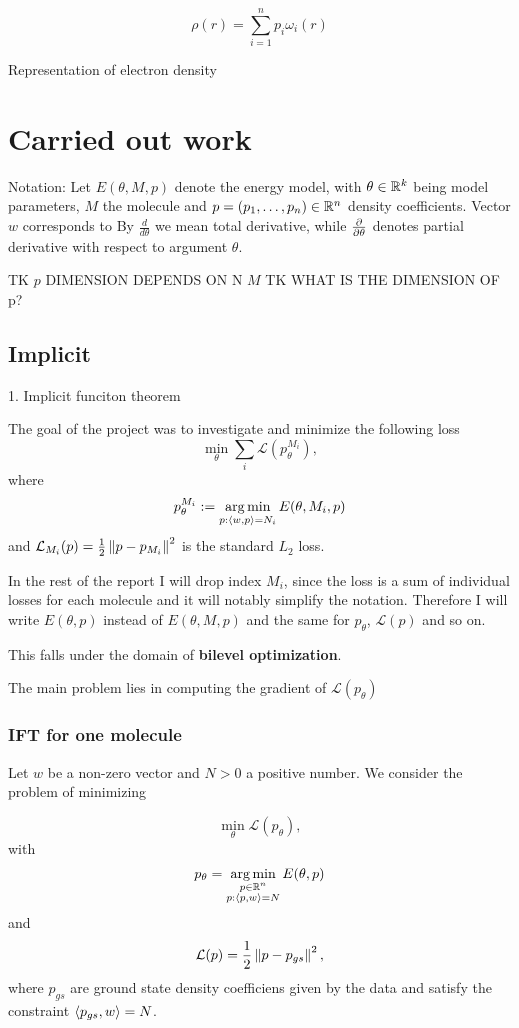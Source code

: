 \documentclass[a4paper,10pt]{report}
\begin{document}
\begin{equation}
 \rho(r) = \sum_{i=1}^n p_i \omega_i(r)
\end{equation}


Representation of electron density
\section{Carried out work}
Notation: Let $E(\theta, M ,p)$ denote the energy model, with $\theta \in \mathbb{R}^k$ being model parameters, $M$ the molecule and $p=(p_1, \ldots ,p_n )\in \mathbb{R}^n$ density coefficients. Vector $w$ corresponds to
By $\frac{d}{d\theta}$ we mean total derivative, while $\frac{\partial }{\partial \theta}$ denotes partial derivative with respect to argument $\theta$.

TK $p$ DIMENSION DEPENDS ON N $M$
TK WHAT IS THE DIMENSION OF p?

 \subsection{Implicit}
1. Implicit funciton theorem

The goal of the project was to investigate and minimize the following loss
\begin{equation}
 \min_\theta \sum_i \mathcal{L}(p_{\theta}^{M_i}),
\end{equation}
where
\begin{equation}
  p_\theta^{M_i}:=\operatorname*{arg\,min}_{p : \langle w, p \rangle=N_i} E(\theta,M_i,p)
\end{equation}
and $\mathcal{L}_{M_i}(p) = \frac{1}{2}\left\|p-p_{M_i}\right\|^2$ is the standard $L_2$ loss.

In the rest of the report I will drop index $M_i$, since the loss is a sum of individual losses for each molecule and it will notably simplify the notation.
Therefore I will write $E(\theta,p)$ instead of $E(\theta,M,p)$ and the same for $p_\theta$, $\mathcal{L}(p)$ and so on.

This falls under the domain of \textbf{bilevel optimization}.

The main problem lies in computing the gradient of $\mathcal{L}(p_\theta)$


\subsubsection{IFT for one molecule}
Let $w$ be a non-zero vector and $N>0$ a positive number.
We consider the problem of minimizing

\begin{equation}
 \min_\theta \mathcal{L}(p_\theta),
\end{equation}
with
\begin{equation}
p_\theta = \operatorname*{arg\,min}_{\substack{p \in \mathbb{R}^n \\ p: \langle p, w \rangle=N }} E(\theta, p)
\end{equation}
and
\begin{equation}
 \mathcal{L}(p) = \frac{1}{2} \left\|p-p_{gs}\right\|^2,
\end{equation}
where $p_{gs}$ are ground state density coefficiens given by the data and satisfy the constraint $\langle p_{gs}, w \rangle = N$.
\end{document}
